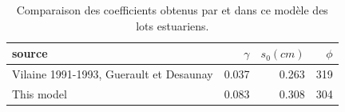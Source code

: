 \begin{table}[htbp]
\centering
\caption{Comparaison des coefficients obtenus par \citet{desaunay_seasonal_1997} et dans ce modèle des lots estuariens.} 
\label{resumé_cyclique}
\begin{tabularx}{0.6\textwidth}{lrrr}
  \hline
source & $\gamma$ & $s_0(cm)$ & $\phi$ \\ 
  \hline
Vilaine 1991-1993, Guerault et Desaunay & 0.037 & 0.263 & 319 \\ 
  This model & 0.083 & 0.308 & 304 \\ 
   \hline
\end{tabularx}
\end{table}
